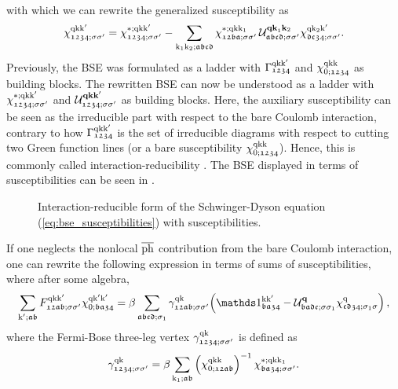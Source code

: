 \documentclass[\main/main.tex]{subfiles}
\begin{document}
with which we can rewrite the generalized susceptibility as
\begin{align}\label{eq:bse_susceptibilities}
	\chi_{\mathfrak{1234};\sigma\sigma'}^{\text{q}\text{k}\text{k}'}=\chi_{\mathfrak{1234};\sigma\sigma'}^{*;\text{q}\text{k}\text{k}'}-\sum_{\text{k}_1\text{k}_2;\mathfrak{abcd}}\chi_{\mathfrak{12ba};\sigma\sigma'}^{*;\text{q}\text{k}\text{k}_1}\, \mathcal{U}^{\textbf{qk}_1\textbf{k}_2}_{\mathfrak{abcd};\sigma\sigma'} \chi_{\mathfrak{dc34};\sigma\sigma'}^{\text{q}\text{k}_2\text{k}'}.
\end{align}
Previously, the BSE was formulated as a ladder with $\Gamma_{\mathfrak{1234}}^{\text{q}\text{k}\text{k}'}$ and $\chi_{0;\mathfrak{1234}}^{\text{q}\text{k}\text{k}}$ as building blocks. The rewritten BSE can now be understood as a ladder with $\chi_{\mathfrak{1234};\sigma\sigma'}^{*;\text{q}\text{k}\text{k}'}$ and $\mathcal{U}^{\textbf{qkk}'}_{\mathfrak{1234};\sigma\sigma'}$ as building blocks. Here, the auxiliary susceptibility can be seen as the irreducible part with respect to the bare Coulomb interaction, contrary to how $\Gamma_{\mathfrak{1234}}^{\text{q}\text{k}\text{k}'}$ is the set of irreducible diagrams with respect to cutting two Green function lines (or a bare susceptibility $\chi_{0;\mathfrak{1234}}^{\text{q}\text{k}\text{k}}$). Hence, this is commonly called interaction-reducibility \cite{Krien2019a}. The BSE displayed in terms of susceptibilities can be seen in .
\begin{figure}[ht!]
	\centering
  	
  	\caption{Interaction-reducible form of the Schwinger-Dyson equation (\ref{eq:bse_susceptibilities}) with susceptibilities.}
  	\label{fig:bse_susceptibilities}
\end{figure}
If one neglects the nonlocal $\overline{\text{ph}}$ contribution from the bare Coulomb interaction, one can rewrite the following expression in terms of sums of susceptibilities, where after some algebra,
\begin{align}
	\sum_{\kp;\mathfrak{ab}}F_{\mathfrak{12ab};\ss'}^{\q\k\kp}\chi_{0;\mathfrak{ba34}}^{\q\kp\kp}=\beta\sum_{\mathfrak{abcd};\sigma_1}\gamma_{\mathfrak{12ab};\ss'}^{\q\k}\!\left (\unity_{\mathfrak{ba34}}^{\k\kp}-\mathcal{U}^{\vv{q}}_{\mathfrak{badc};\ss_1}\chi^{\q}_{\mathfrak{cd34};\sigma_1\sigma}\right ),
\end{align}
where the Fermi-Bose three-leg vertex $\gamma_{\mathfrak{1234};\sigma\sigma'}^{\text{q}\text{k}}$ is defined as
\begin{align}\label{eq:vrg}
	\gamma_{\mathfrak{1234};\sigma\sigma'}^{\text{q}\text{k}} = \beta \sum_{\text{k}_1;\mathfrak{ab}}\left (\chi_{0;\mathfrak{12ab}}^{\text{q}\text{k}\text{k}}\right )^{-1}\chi_{\mathfrak{ba34};\sigma\sigma'}^{*;\text{q}\text{k}\text{k}_1}.
\end{align}
\end{document}
